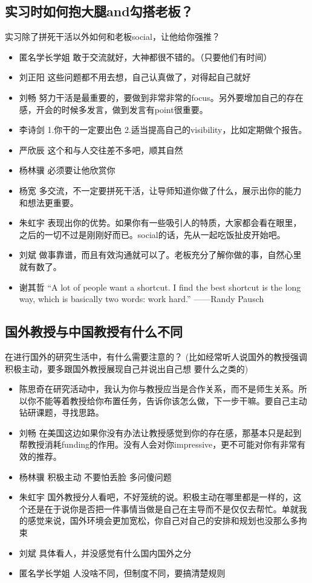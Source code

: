 \documentclass{vivid_layout}
\begin{document}
\subsection{实习时如何抱大腿and勾搭老板？}
实习除了拼死干活以外如何和老板social，让他给你强推？
\begin{itemize}
\item {\name 匿名学长学姐}  \quad 敢于交流就好，大神都很不错的。（只要他们有时间）
\item  { 刘正阳}  \quad 这些问题都不用去想，自己认真做了，对得起自己就好
\item  { 刘畅}  \quad 努力干活是最重要的，要做到非常非常的focus。另外要增加自己的存在感，开会的时候多发言，做到发言有point很重要。
\item  { 李诗剑}  \quad 1.你干的一定要出色 2.适当提高自己的visibility，比如定期做个报告。
\item  { 严欣辰}  \quad 这个和与人交往差不多吧，顺其自然
\item  { 杨林骥}  \quad 必须要让他欣赏你
\item  { 杨宽}  \quad 多交流，不一定要拼死干活，让导师知道你做了什么，展示出你的能力和想法更重要。
\item  { 朱虹宇}  \quad 表现出你的优势。如果你有一些吸引人的特质，大家都会看在眼里，之后的一切不过是刚刚好而已。social的话，先从一起吃饭扯皮开始吧。
\item  { 刘斌}  \quad 做事靠谱，而且有效沟通就可以了。老板充分了解你做的事，自然心里就有数了。
\item { 谢其哲}  \quad “A lot of people want a shortcut. I find the best shortcut is the long way, which is basically two words: work hard.” ——Randy Pausch
\end{itemize}

\subsection{国外教授与中国教授有什么不同}
在进行国外的研究生活中，有什么需要注意的？ (比如经常听人说国外的教授强调积极主动，要多跟国外教授展现自己并说出自己想 要什么之类的)
\begin{itemize}
\item { 陈思奇}\quad 在研究活动中，我认为你与教授应当是合作关系，而不是师生关系。所以你不能等着教授给你布置任务，告诉你该怎么做，下一步干嘛。要自己主动钻研课题，寻找思路。
\item  { 刘畅}  \quad 在美国这边如果你没有办法让教授感觉到你的存在感，那基本只是起到帮教授消耗funding的作用。没有人会对你impressive，更不可能对你有非常有效的推荐。
\item  { 杨林骥}  \quad 积极主动 不要怕丢脸 多问傻问题
\item  { 朱虹宇}  \quad 国外教授分人看吧，不好笼统的说。积极主动在哪里都是一样的，这个还是在于说你是否把一件事情当做是自己在主导而不是仅仅去帮忙。单就我的感觉来说，国外环境会更加宽松，你自己对自己的安排和规划也没那么多拘束
\item  { 刘斌}  \quad 具体看人，并没感觉有什么国内国外之分
\item {\name 匿名学长学姐}  \quad 人没啥不同，但制度不同，要搞清楚规则
\end{itemize}
\end{document}
